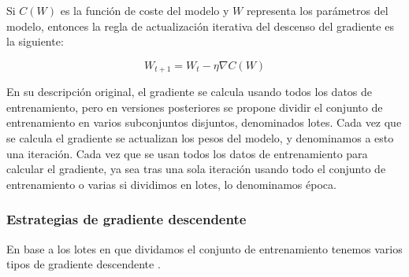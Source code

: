 Si $C(W)$ es la función de coste del modelo y $W$ representa los parámetros del modelo, entonces la regla de actualización iterativa del descenso del gradiente es la siguiente:

\begin{equation}\label{eq:GD}
W_{t+1}=W_t - \eta \nabla C(W)
\end{equation}

En su descripción original, el gradiente se calcula usando todos los datos de entrenamiento, pero en versiones posteriores se propone dividir el conjunto de entrenamiento en varios subconjuntos disjuntos, denominados lotes. Cada vez que se calcula el gradiente se actualizan los pesos del modelo, y denominamos a esto una iteración. Cada vez que se usan todos los datos de entrenamiento para calcular el gradiente, ya sea tras una sola iteración usando todo el conjunto de entrenamiento o varias si dividimos en lotes, lo denominamos época.



\subsubsection{Estrategias de gradiente descendente} \label{sec:estrategias}

En base a los lotes en que dividamos el conjunto de entrenamiento tenemos varios tipos de gradiente descendente \cite{GoodFellowBook}.

